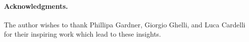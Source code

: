 \paragraph{Acknowledgments.}
The author wishes to thank Phillipa Gardner, Giorgio Ghelli, and Luca
Cardelli for their inspiring work which lead to these insights.
